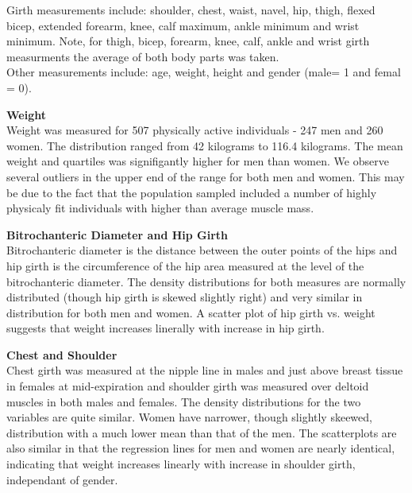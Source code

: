 \documentclass[11pt]{article}
\begin{document}
Girth measurements include: shoulder, chest, waist, navel, hip, thigh, flexed bicep, extended forearm, knee, calf maximum, ankle minimum and wrist minimum. Note, for thigh, bicep, forearm, knee, calf, ankle and wrist girth measurments the average of both body parts was taken.\\

Other measurements include: age, weight, height and gender (male= 1 and femal = 0).\\


\newpage

\textbf{Weight}\\ %
   
Weight was measured for 507 physically active individuals - 247 men and 260 women. The distribution ranged from 42 kilograms to 116.4 kilograms. The mean weight and quartiles was signifigantly higher for men than women. We observe several outliers in the upper end of the range for both men and women. This may be due to the fact that the population sampled included a number of highly physicaly fit individuals with higher than average muscle mass.



\newpage

\textbf{Bitrochanteric Diameter and Hip Girth}\\ %
 
Bitrochanteric diameter is the distance between the outer points of the hips and hip girth is the circumference of the hip area measured at the level of the bitrochanteric diameter. The density distributions for both measures are normally distributed (though hip girth is skewed slightly right) and very similar in distribution for both men and women. A scatter plot of hip girth vs. weight suggests that weight increases linerally with increase in hip girth.





\newpage

\textbf{Chest and Shoulder}\\ %
   
Chest girth was measured at the nipple line in males and just above breast tissue in females at mid-expiration and shoulder girth was measured over deltoid muscles in both males and females. The density distributions for the two variables are quite similar. Women have narrower, though slightly skeewed, distribution with a much lower mean than that of the men. The scatterplots are also similar in that the regression lines for men and women are nearly identical, indicating that weight increases linearly with increase in shoulder girth, independant of gender.
\end{document}
